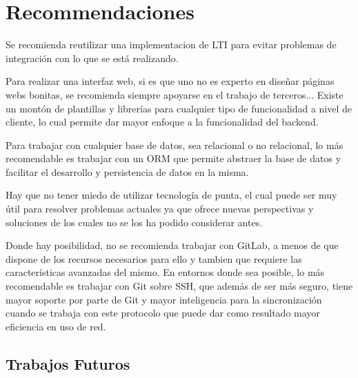 
\chapter{Recommendaciones}
\label{capitulo8}

Se recomienda reutilizar una implementacion de LTI para evitar problemas de integración con lo que se está realizando.

Para realizar una interfaz web, si es que uno no es experto en diseñar páginas webs bonitas, se recomienda siempre apoyarse en el trabajo de terceros... Existe un montón de plantillas y librerías para cualquier tipo de funcionalidad a nivel de cliente, lo cual permite dar mayor enfoque a la funcionalidad del backend.

Para trabajar con cualquier base de datos, sea relacional o no relacional, lo más recomendable es trabajar con un ORM que permite abstraer la base de datos y facilitar el desarrollo y persistencia de datos en la misma.

Hay que no tener miedo de utilizar tecnología de punta, el cual puede ser muy útil para resolver problemas actuales ya que ofrece nuevas perspectivas y soluciones de los cuales no se los ha podido considerar antes.

Donde hay posibilidad, no se recomienda trabajar con GitLab, a menos de que dispone de los recursos necesarios para ello y tambien que requiere las características avanzadas del mismo. En entornos donde sea posible, lo más recomendable es trabajar con Git sobre SSH, que además de ser más seguro, tiene mayor soporte por parte de Git y mayor inteligencia para la sincronización cuando se trabaja con este protocolo que puede dar como resultado mayor eficiencia en uso de red.


\section{Trabajos Futuros}
